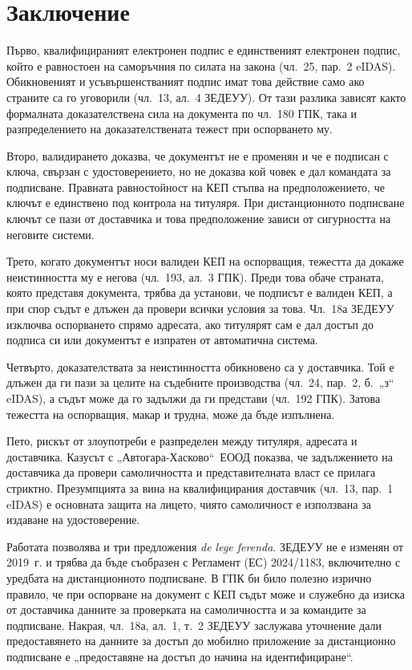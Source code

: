 \section{Заключение}
\label{sec:zaklyuchenie}

Първо, квалифицираният електронен подпис е единственият електронен подпис, който е
равностоен на саморъчния по силата на закона (чл.~25, пар.~2 eIDAS). Обикновеният и
усъвършенстваният подпис имат това действие само ако страните са го уговорили (чл.~13,
ал.~4 ЗЕДЕУУ). От тази разлика зависят както формалната доказателствена сила на документа
по чл.~180 ГПК, така и разпределението на доказателствената тежест при оспорването му.

Второ, валидирането доказва, че документът не е променян и че е подписан с ключа, свързан
с удостоверението, но не доказва кой човек е дал командата за подписване. Правната
равностойност на КЕП стъпва на предположението, че ключът е единствено под контрола на
титуляря. При дистанционното подписване ключът се пази от доставчика и това предположение
зависи от сигурността на неговите системи.

Трето, когато документът носи валиден КЕП на оспорващия, тежестта да докаже неистинността
му е негова (чл.~193, ал.~3 ГПК). Преди това обаче страната, която представя документа,
трябва да установи, че подписът е валиден КЕП, а при спор съдът е длъжен да провери всички
условия за това. Чл.~18а ЗЕДЕУУ изключва оспорването спрямо адресата, ако титулярят сам е
дал достъп до подписа си или документът е изпратен от автоматична система.

Четвърто, доказателствата за неистинността обикновено са у доставчика. Той е длъжен да ги
пази за целите на съдебните производства (чл.~24, пар.~2, б.~„з“ eIDAS), а съдът може да
го задължи да ги представи (чл.~192 ГПК). Затова тежестта на оспорващия, макар и трудна,
може да бъде изпълнена.

Пето, рискът от злоупотреби е разпределен между титуляря, адресата и доставчика. Казусът
с „Автогара-Хасково“~ЕООД показва, че задължението на доставчика да провери самоличността
и представителната власт се прилага стриктно. Презумпцията за вина на квалифицирания
доставчик (чл.~13, пар.~1 eIDAS) е основната защита на лицето, чиято самоличност е
използвана за издаване на удостоверение.

Работата позволява и три предложения \textit{de lege ferenda}. ЗЕДЕУУ не е изменян от
2019~г. и трябва да бъде съобразен с Регламент (ЕС) 2024/1183, включително с уредбата на
дистанционното подписване. В ГПК би било полезно изрично правило, че при оспорване на
документ с КЕП съдът може и служебно да изиска от доставчика данните за проверката на
самоличността и за командите за подписване. Накрая, чл.~18а, ал.~1, т.~2 ЗЕДЕУУ заслужава
уточнение дали предоставянето на данните за достъп до мобилно приложение за дистанционно
подписване е „предоставяне на достъп до начина на идентифициране“.
